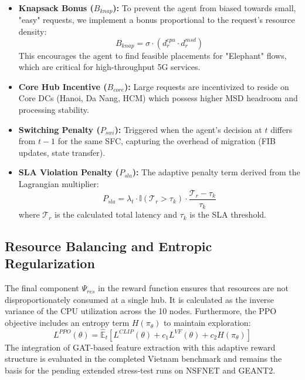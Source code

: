 \documentclass[12pt, a4paper, reqno, oneside]{book}
\begin{document}
\begin{itemize}
    \item \textbf{Knapsack Bonus ($B_{knap}$):} To prevent the agent from biased towards small, "easy" requests, we implement a bonus proportional to the request's resource density:
    \begin{equation}
    B_{knap} = \sigma \cdot \left( d_r^{cpu} \cdot d_r^{msd} \right)
    \end{equation}
    This encourages the agent to find feasible placements for "Elephant" flows, which are critical for high-throughput 5G services.
    \item \textbf{Core Hub Incentive ($B_{core}$):} Large requests are incentivized to reside on Core DCs (Hanoi, Da Nang, HCM) which possess higher MSD headroom and processing stability.
    \item \textbf{Switching Penalty ($P_{swi}$):} Triggered when the agent's decision at $t$ differs from $t-1$ for the same SFC, capturing the overhead of migration (FIB updates, state transfer).
    \item \textbf{SLA Violation Penalty ($P_{sla}$):} The adaptive penalty term derived from the Lagrangian multiplier:
    \begin{equation}
    P_{sla} = \lambda_t \cdot \mathbb{I}(\mathcal{T}_r > \tau_k) \cdot \frac{\mathcal{T}_r - \tau_k}{\tau_k}
    \end{equation}
    where $\mathcal{T}_r$ is the calculated total latency and $\tau_k$ is the SLA threshold.
\end{itemize}

\subsection{Resource Balancing and Entropic Regularization}
The final component $\Psi_{res}$ in the reward function ensures that resources are not disproportionately consumed at a single hub. It is calculated as the inverse variance of the CPU utilization across the 10 nodes. Furthermore, the PPO objective includes an entropy term $H(\pi_\theta)$ to maintain exploration:
\begin{equation}
L^{PPO}(\theta) = \hat{\mathbb{E}}_t [ L^{CLIP}(\theta) + c_1 L^{VF}(\theta) + c_2 H(\pi_\theta) ]
\end{equation}
The integration of GAT-based feature extraction with this adaptive reward structure is evaluated in the completed Vietnam benchmark and remains the basis for the pending extended stress-test runs on NSFNET and GEANT2.
\end{document}
